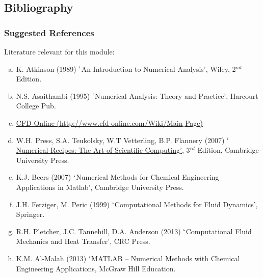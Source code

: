 \documentclass[10pt,compress,handout,ignorenonframetext]{beamer}
\begin{document}
\subsection{Bibliography} 
\begin{frame}
 \frametitle{Suggested References}
  Literature relevant for this module:
  \begin{enumerate}[(a)]
   \item K. Atkinson (1989) $\lq$An Introduction to Numerical Analysis', Wiley, 2$^{nd}$ Edition.
   \item N.S. Asaithambi (1995) $\lq$Numerical Analysis: Theory and Practice', Harcourt College Pub.
   \item \href{http://www.cfd-online.com/Wiki/Main_Page}{CFD Online (http://www.cfd-online.com/Wiki/Main$\_$Page)}
   \item W.H. Press, S.A. Teukolsky, W.T Vetterling, B.P. Flannery (2007) \href{http://www.nr.com/oldverswitcher.html}{$\lq$Numerical Recipes: The Art of Scientific Computing'}, 3$^{rd}$ Edition, Cambridge University Press.
   \item K.J. Beers (2007) $\lq$Numerical Methods for Chemical Engineering -- Applications in Matlab', Cambridge University Press.
   \item J.H. Ferziger, M. Peric (1999) $\lq$Computational Methods for Fluid Dynamics', Springer.
   \item R.H. Pletcher, J.C. Tannehill, D.A. Anderson (2013) $\lq$Computational Fluid Mechanics and Heat Transfer', CRC Press.
   \item K.M. Al-Malah (2013) $\lq$MATLAB -- Numerical Methods with Chemical Engineering Applications, McGraw Hill Education.
  \end{enumerate}
\end{frame}
\end{document}
